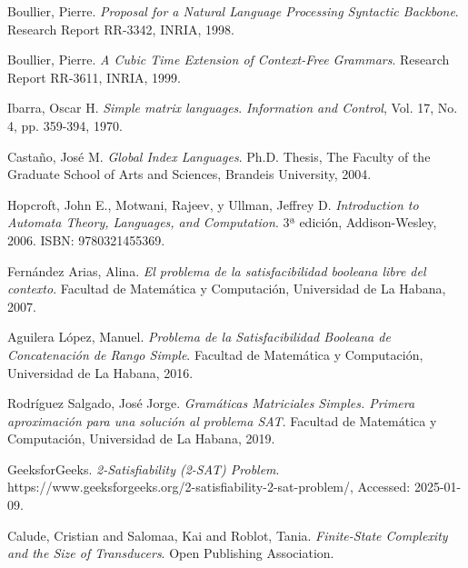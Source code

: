 \documentclass[12pt]{article}
\begin{document}
\begin{thebibliography}{99}
  
  Boullier, Pierre. 
  \textit{Proposal for a Natural Language Processing Syntactic Backbone}. 
  Research Report RR-3342, INRIA, 1998. 
  
  Boullier, Pierre. 
  \textit{A Cubic Time Extension of Context-Free Grammars}. 
  Research Report RR-3611, INRIA, 1999. 
  
  Ibarra, Oscar H. 
  \textit{Simple matrix languages}. 
  \textit{Information and Control}, Vol. 17, No. 4, pp. 359-394, 1970. 
  
  Castaño, José M. 
  \textit{Global Index Languages}. 
  Ph.D. Thesis, The Faculty of the Graduate School of Arts and Sciences, Brandeis University, 2004.
  
  Hopcroft, John E., Motwani, Rajeev, y Ullman, Jeffrey D. 
  \textit{Introduction to Automata Theory, Languages, and Computation}. 
  3ª edición, Addison-Wesley, 2006. ISBN: 9780321455369.
  
  Fernández Arias, Alina. 
  \textit{El problema de la satisfacibilidad booleana libre del contexto}. 
  Facultad de Matemática y Computación, Universidad de La Habana, 2007.
  
  Aguilera López, Manuel. 
  \textit{Problema de la Satisfacibilidad Booleana de Concatenación de Rango Simple}. 
  Facultad de Matemática y Computación, Universidad de La Habana, 2016.
  
  Rodríguez Salgado, José Jorge. 
  \textit{Gramáticas Matriciales Simples. Primera aproximación para una solución al problema SAT}. 
  Facultad de Matemática y Computación, Universidad de La Habana, 2019.
  
  GeeksforGeeks. 
  \textit{2-Satisfiability (2-SAT) Problem}. 
  https://www.geeksforgeeks.org/2-satisfiability-2-sat-problem/, Accessed: 2025-01-09.
  
  Calude, Cristian and Salomaa, Kai and Roblot, Tania.
  \textit{Finite-State Complexity and the Size of Transducers}. 
  Open Publishing Association. 
  
  
  
\end{thebibliography}
\end{document}
